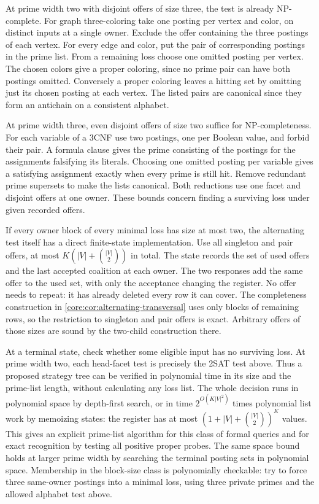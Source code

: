 At prime width two with disjoint offers of size
three, the test is already NP-complete. For graph
three-coloring take one posting per vertex and
color, on distinct inputs at a single owner.
Exclude the offer containing the three postings
of each vertex. For every edge and color, put
the pair of corresponding postings in the prime
list. From a remaining loss choose one omitted
posting per vertex. The chosen colors give a
proper coloring, since no prime pair can have
both postings omitted. Conversely a proper
coloring leaves a hitting set by omitting just
its chosen posting at each vertex. The listed
pairs are canonical since they form an antichain
on a consistent alphabet.

At prime width three, even disjoint offers of
size two suffice for NP-completeness. For each
variable of a 3CNF use two postings, one per
Boolean value, and forbid their pair. A formula
clause gives the prime consisting of the postings
for the assignments falsifying its literals.
Choosing one omitted posting per variable gives
a satisfying assignment exactly when every prime
is still hit. Remove redundant prime supersets
to make the lists canonical. Both reductions use
one facet and disjoint offers at one owner. These
bounds concern finding a surviving loss under
given recorded offers.

If every owner block of every minimal loss has
size at most two, the alternating test itself
has a direct finite-state implementation. Use all
singleton and pair offers, at most
$K(|V|+\binom{|V|}{2})$ in total. The state records
the set of used offers and the last accepted
coalition at each owner. The two responses add
the same offer to the used set, with only the
acceptance changing the register. No offer needs
to repeat: it has already deleted every row it
can cover. The completeness construction in
\cref{core:cor:alternating-transversal} uses only
blocks of remaining rows, so the restriction to
singleton and pair offers is exact. Arbitrary
offers of those sizes are sound by the two-child
construction there.

At a terminal state, check whether some eligible
input has no surviving loss. At prime width two,
each head-facet test is precisely the 2SAT test
above. Thus a proposed strategy tree can be
verified in polynomial time in its size and the
prime-list length, without calculating any loss
list. The whole decision runs in polynomial
space by depth-first search, or in time
$2^{O(K|V|^2)}$ times polynomial list work by
memoizing states: the register has at most
$(1+|V|+\binom{|V|}{2})^K$ values. This gives an
explicit prime-list algorithm for this class of
formal queries and for exact recognition by
testing all positive proper probes. The same
space bound holds at larger prime width by
searching the terminal posting sets in
polynomial space. Membership in the block-size
class is polynomially checkable: try to force
three same-owner postings into a minimal loss,
using three private primes and the allowed
alphabet test above.

